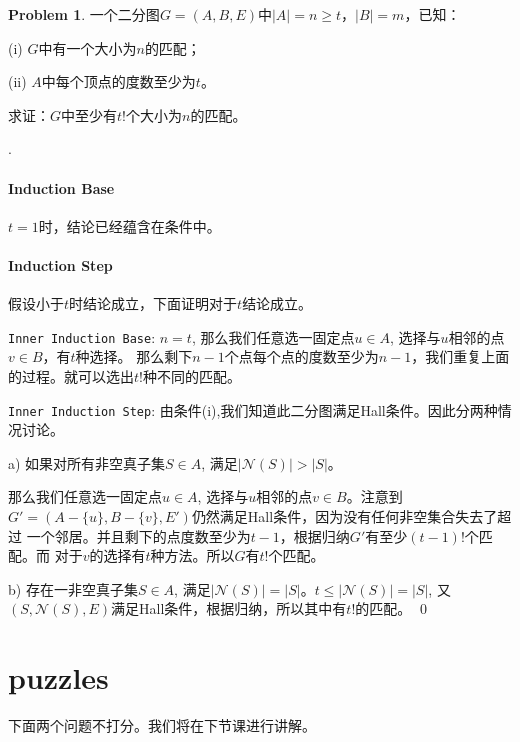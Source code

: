\documentclass[UTF8]{ctexart}
\newenvironment{sol}
  {\par\vspace{3mm}\noindent{\it Solution}.}
  {\qed \\ \medskip}
\theoremstyle{definition}
\newtheorem{problem}{Problem}
\begin{document}
\begin{problem}
一个二分图$G = (A, B, E)$中$|A| = n \geq t$，$|B| = m$，已知：

(i) $G$中有一个大小为$n$的匹配；

(ii) $A$中每个顶点的度数至少为$t$。

求证：$G$中至少有$t!$个大小为$n$的匹配。
\begin{sol}
    \paragraph{Induction Base} $t=1$时，结论已经蕴含在条件中。

    \paragraph{Induction Step} 假设小于$t$时结论成立，下面证明对于$t$结论成立。
    
    \texttt{Inner Induction Base}: $n=t$, 那么我们任意选一固定点$u \in A$, 选择与$u$相邻的点$v \in B$，有$t$种选择。
    那么剩下$n-1$个点每个点的度数至少为$n-1$，我们重复上面的过程。就可以选出$t!$种不同的匹配。

    \texttt{Inner Induction Step}:
    由条件(i),我们知道此二分图满足Hall条件。因此分两种情况讨论。

    a) 如果对所有非空真子集$S \in A$, 满足$|\mathcal{N}(S)| > |S|$。

    那么我们任意选一固定点$u \in A$, 选择与$u$相邻的点$v \in B$。注意到
    $G'=(A-\{u\}, B-\{v\}, E')$仍然满足Hall条件，因为没有任何非空集合失去了超过
    一个邻居。并且剩下的点度数至少为$t-1$，根据归纳$G'$有至少$(t-1)!$个匹配。而
    对于$v$的选择有$t$种方法。所以$G$有$t!$个匹配。

    b) 存在一非空真子集$S \in A$,  满足$|\mathcal{N}(S)| = |S|$。$t \leq |\mathcal{N}(S)| = |S|$, 
    又$(S, \mathcal{N}(S), E)$满足Hall条件，根据归纳，所以其中有$t!$的匹配。
\end{sol}
\end{problem}

\section*{puzzles}

下面两个问题不打分。我们将在下节课进行讲解。
\end{document}
